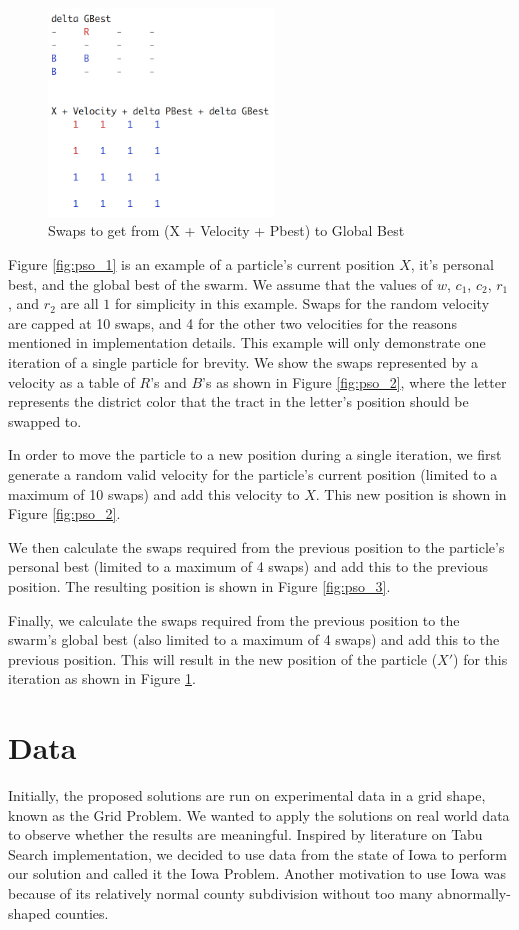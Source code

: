 \documentclass[journal]{IEEEtran}
\begin{document}
\begin{figure}[h!]
    \includegraphics[width=6cm]{pso4.png}
    \centering
    \caption{Swaps to get from (X + Velocity + Pbest) to Global Best}
        \label{fig:pso_4}
\end{figure}

Figure \ref{fig:pso_1} is an example of a particle's current position $X$, it's personal best, and the global best of the swarm. We assume that the values of $w$, $c_1$, $c_2$, $r_1$, and $r_2$ are all $1$ for simplicity in this example. Swaps for the random velocity are capped at 10 swaps, and 4 for the other two velocities for the reasons mentioned in implementation details. This example will only demonstrate one iteration of a single particle for brevity. We show the swaps represented by a velocity as a table of $R$'s and $B$'s as shown in Figure \ref{fig:pso_2}, where the letter represents the district color that the tract in the letter's position should be swapped to.

In order to move the particle to a new position during a single iteration, we first generate a random valid velocity for the particle's current position (limited to a maximum of 10 swaps) and add this velocity to $X$. This new position is shown in Figure \ref{fig:pso_2}.

We then calculate the swaps required from the previous position to the particle's personal best (limited to a maximum of 4 swaps) and add this to the previous position. The resulting position is shown in Figure \ref{fig:pso_3}.

Finally, we calculate the swaps required from the previous position to the swarm's global best (also limited to a maximum of 4 swaps) and add this to the previous position. This will result in the new position of the particle ($X'$) for this iteration as shown in Figure \ref{fig:pso_4}.

\section{Data}
Initially, the proposed solutions are run on experimental data in a grid shape,
known as the Grid Problem. We wanted to apply the solutions on real world data
to observe whether the results are meaningful. Inspired by literature on Tabu
Search implementation, we decided to use data from the state of Iowa to perform
our solution and called it the Iowa Problem. Another motivation to use Iowa was
because of its relatively normal county subdivision without too many
abnormally-shaped counties.
\end{document}
